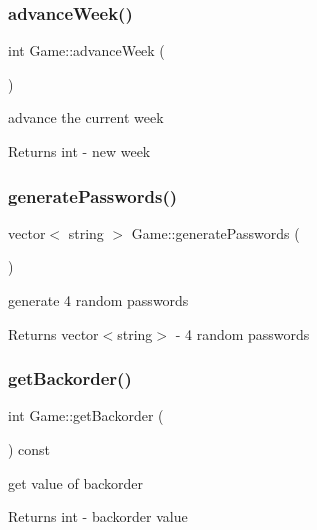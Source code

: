 \subsubsection{\texorpdfstring{advance\+Week()}{advanceWeek()}}
{\footnotesize\ttfamily int Game\+::advance\+Week (\begin{DoxyParamCaption}{ }\end{DoxyParamCaption})}

advance the current week \begin{DoxyReturn}{Returns}
int -\/ new week 
\end{DoxyReturn}
\mbox{\label{classGame_a88a61be96d6266e6b7efaae089b43ff5}} 
\subsubsection{\texorpdfstring{generate\+Passwords()}{generatePasswords()}}
{\footnotesize\ttfamily vector$<$ string $>$ Game\+::generate\+Passwords (\begin{DoxyParamCaption}{ }\end{DoxyParamCaption})}

generate 4 random passwords \begin{DoxyReturn}{Returns}
vector$<$string$>$ -\/ 4 random passwords 
\end{DoxyReturn}
\mbox{\label{classGame_a679d1b8cccec8ef599afba5fc05e254f}} 
\subsubsection{\texorpdfstring{get\+Backorder()}{getBackorder()}}
{\footnotesize\ttfamily int Game\+::get\+Backorder (\begin{DoxyParamCaption}{ }\end{DoxyParamCaption}) const}

get value of backorder \begin{DoxyReturn}{Returns}
int -\/ backorder value 
\end{DoxyReturn}
\mbox{\label{classGame_ac00135b6b5128aca74b09e9f79d54b60}} 

